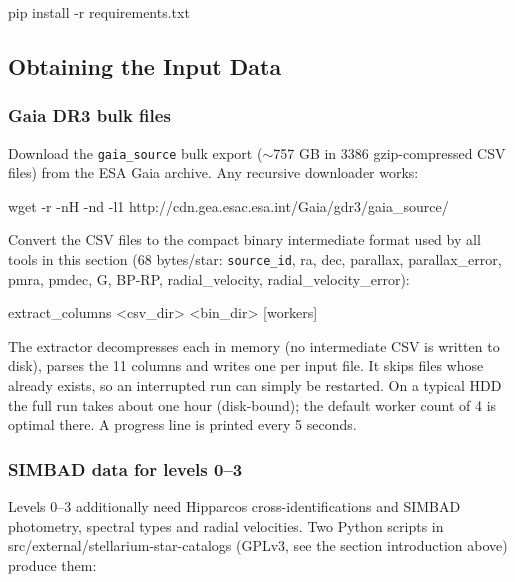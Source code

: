 \begin{commands}
pip install -r requirements.txt
\end{commands}

\subsection{Obtaining the Input Data}
\label{sec:StarCatalogues:Generating:Data}

\subsubsection{Gaia DR3 bulk files}

Download the \texttt{gaia\_source} bulk export ($\sim$757 GB in 3386
gzip-compressed CSV files) from the ESA Gaia archive. Any recursive
downloader works:

\begin{commands}
wget -r -nH -nd -l1
        http://cdn.gea.esac.esa.int/Gaia/gdr3/gaia_source/
\end{commands}

Convert the CSV files to the compact binary intermediate format used by all
tools in this section (68 bytes/star: \texttt{source\_id}, ra, dec,
parallax, parallax\_error, pmra, pmdec, G, BP-RP, radial\_velocity,
radial\_velocity\_error):

\begin{commands}
extract_columns <csv_dir> <bin_dir>
        [workers]
\end{commands}

The extractor decompresses each  in memory (no intermediate
CSV is written to disk), parses the 11 columns and writes one 
per input file. It skips files whose  already exists, so an
interrupted run can simply be restarted. On a typical HDD the full run takes
about one hour (disk-bound); the default worker count of 4 is optimal there.
A progress line is printed every 5 seconds.

\subsubsection{SIMBAD data for levels 0--3}

Levels 0--3 additionally need Hipparcos cross-identifications and SIMBAD
photometry, spectral types and radial velocities. Two Python scripts in src/external/stellarium-star-catalogs
(GPLv3, see the section introduction above) produce them:

